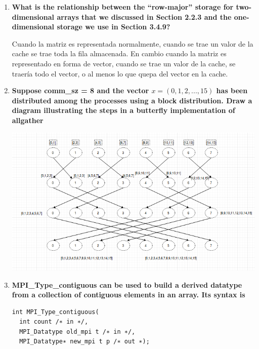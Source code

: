 \documentclass[a4paper,12pt]{article}
\begin{document}
\begin{enumerate}
\begin{enumerate}
\begin{lstlisting}
void print_two_d(int  two_d[][4], int rows, int cols){
	for(int i = 0; i < rows; i++){
		for(int j = 0; j < cols; j++){
			printf("%d ", two_d[i][j]);
		}
		printf("\n");
	}
	printf("\n");
}


int main(){
	int two_d[3][4];
	for(int i = 0; i < 3; i++){
		for(int j = 0; j < 4; j++){
			two_d[i][j] = j;
		}
	}
	print_two_d(two_d, 3 , 4);
}  
\end{lstlisting}
\end{enumerate}

\item \textbf{What is the relationship between the “row-major” storage for two-dimensional arrays that
we discussed in Section 2.2.3 and the one-dimensional storage we use in Section 3.4.9?}

Cuando la matriz es representada normalmente, cuando se trae un valor de la cache se trae toda la fila almacenada.
En cambio cuando la matriz es representado en forma de vector, cuando se trae un valor de la cache, se traería todo
el vector, o al menos lo que quepa del vector en la cache.

\item \textbf{Suppose comm\_sz = 8 and the vector $x = (0, 1, 2, . . . , 15)$ has been distributed
among the processes using a block distribution. Draw a diagram illustrating the steps in a butterfly
implementation of allgather }

\includegraphics[scale = 0.6]{16.png}

\item{ \textbf{MPI\_Type\_contiguous can be used to build a derived datatype from a collection of contiguous
elements in an array. Its syntax is}

\begin{lstlisting}
int MPI_Type_contiguous(
  int count /∗ in ∗/,
  MPI_Datatype old_mpi t /∗ in ∗/,
  MPI_Datatype∗ new_mpi t p /∗ out ∗);
\end{lstlisting}

}
\end{enumerate}
\end{document}
